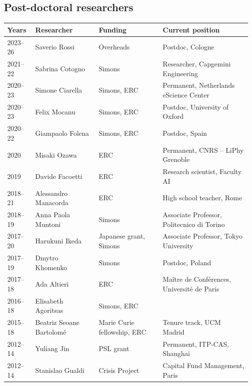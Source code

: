 \documentclass[a4paper,10pt]{article}
\begin{document}
\subsection{Post-doctoral researchers}
\vspace{4pt}
{\small
\begin{tabularx}{\textwidth}{@{}>{\hspace{0pt}\color{datecol}}p{} p{} p{} >{\raggedright\arraybackslash}X@{}}
\textbf{Years} & \textbf{Researcher} & \textbf{Funding} & \textbf{Current position} \\[1pt]
\hline
2023--26 & Saverio Rossi & Overheads & Postdoc, Cologne \\
2021--22 & Sabrina Cotogno & Simons & Researcher, Capgemini Engineering \\
2020--23 & Simone Ciarella & Simons, ERC & Permanent, Netherlands eScience Center \\
2020--23 & Felix Mocanu & Simons, ERC & Postdoc, University of Oxford \\
2020--22 & Giampaolo Folena & Simons, ERC & Postdoc, Spain \\
2020 & Misaki Ozawa & ERC & Permanent, CNRS -- LiPhy Grenoble \\
2019 & Davide Facoetti & ERC & Research scientist, Faculty AI \\
2018--21 & Alessandro Manacorda & ERC & High school teacher, Rome \\
2018--19 & Anna Paola Muntoni & Simons & Associate Professor, Politecnico di Torino \\
2017--20 & Harukuni Ikeda & Japanese grant, Simons & Associate Professor, Tokyo University \\
2017--19 & Dmytro Khomenko & Simons & Postdoc, Poland \\
2017--18 & Ada Altieri & ERC & Maître de Conférences, Université de Paris \\
2016--18 & Elisabeth Agoritsas & Simons, ERC & \\
2015--18 & Beatriz Seoane Bartolomé & Marie Curie fellowship, ERC & Tenure track, UCM Madrid \\
2012--14 & Yuliang Jin & PSL grant & Permanent, ITP-CAS, Shanghai \\
2012--14 & Stanislao Gualdi & Crisis Project & Capital Fund Management, Paris \\
\hline
\end{tabularx}}
\end{document}
